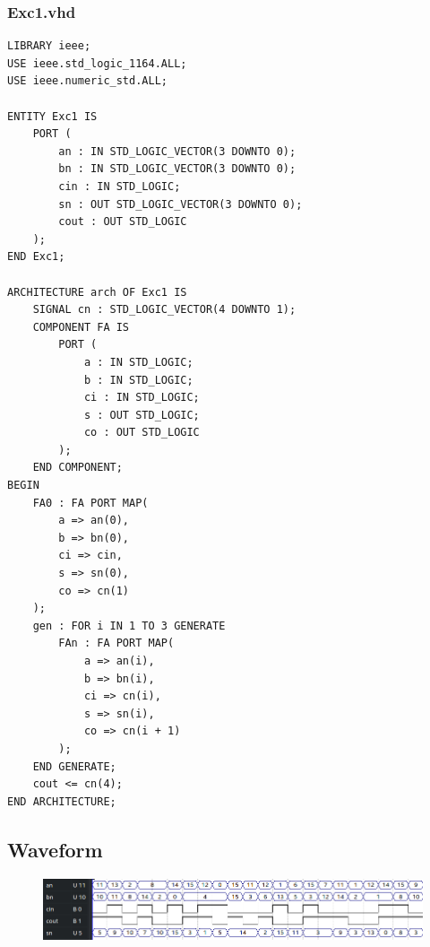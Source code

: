 \documentclass[13pt,a4paper]{report}
\begin{document}
\subsubsection{Exc1.vhd}
\begin{verbatim}
LIBRARY ieee;
USE ieee.std_logic_1164.ALL;
USE ieee.numeric_std.ALL;

ENTITY Exc1 IS
	PORT (
		an : IN STD_LOGIC_VECTOR(3 DOWNTO 0);
		bn : IN STD_LOGIC_VECTOR(3 DOWNTO 0);
		cin : IN STD_LOGIC;
		sn : OUT STD_LOGIC_VECTOR(3 DOWNTO 0);
		cout : OUT STD_LOGIC
	);
END Exc1;

ARCHITECTURE arch OF Exc1 IS
	SIGNAL cn : STD_LOGIC_VECTOR(4 DOWNTO 1);
	COMPONENT FA IS
		PORT (
			a : IN STD_LOGIC;
			b : IN STD_LOGIC;
			ci : IN STD_LOGIC;
			s : OUT STD_LOGIC;
			co : OUT STD_LOGIC
		);
	END COMPONENT;
BEGIN
	FA0 : FA PORT MAP(
		a => an(0),
		b => bn(0),
		ci => cin,
		s => sn(0),
		co => cn(1)
	);
	gen : FOR i IN 1 TO 3 GENERATE
		FAn : FA PORT MAP(
			a => an(i),
			b => bn(i),
			ci => cn(i),
			s => sn(i),
			co => cn(i + 1)
		);
	END GENERATE;
	cout <= cn(4);
END ARCHITECTURE;
\end{verbatim}

\subsection{Waveform}
\begin{figure}[H]
\centering
\includegraphics[scale=0.8]{images/Exc1_waveform.png}
\end{figure}
\end{document}
